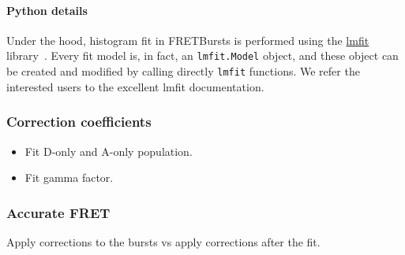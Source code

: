 \paragraph{Python details}
Under the hood, histogram fit in FRETBursts is performed using the
\href{http://lmfit.github.io/lmfit-py/}{lmfit} library~\cite{c09228b4-321a-404b-8f8c-e56696295eda}.
Every fit model is, in fact, an \verb|lmfit.Model| object, and these object
can be created and modified by calling directly \verb|lmfit| functions.
We refer the interested users to the excellent lmfit documentation.

\subsubsection{Correction coefficients}

\begin{itemize}
\item Fit D-only and A-only population.
\item Fit gamma factor.
\end{itemize}


\subsubsection{Accurate FRET}

Apply corrections to the bursts vs apply corrections after the fit.


